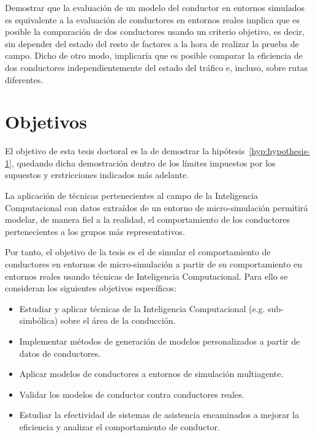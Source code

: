 Demostrar que la evaluación de un modelo del conductor en entornos simulados es equivalente a la evaluación de conductores en entornos reales implica que es posible la comparación de dos conductores usando un criterio objetivo, es decir, sin depender del estado del resto de factores a la hora de realizar la prueba de campo. Dicho de otro modo, implicaría que es posible comparar la eficiencia de dos conductores independientemente del estado del tráfico e, incluso, sobre rutas diferentes.

\section{Objetivos}
\label{ch:intro:objectives}

	El objetivo de esta tesis doctoral es la de demostrar la hipótesis~\ref{hyp:hypothesis-1}, quedando dicha demostración dentro de los límites impuestos por los supuestos y erstricciones indicados más adelante.

\begin{hyp} \label{hyp:hypothesis-1}
	La aplicación de técnicas pertenecientes al campo de la Inteligencia Computacional con datos extraídos de un entorno de micro-simulación permitirá modelar, de manera fiel a la realidad, el comportamiento de los conductores pertenecientes a los grupos más representativos.
\end{hyp}

Por tanto, el objetivo de la tesis es el de simular el comportamiento de conductores en entornos de micro-simulación a partir de su comportamiento en entornos reales usando técnicas de Inteligencia Computacional. Para ello se consideran los siguientes objetivos específicos:

\begin{itemize}
	\item Estudiar y aplicar técnicas de la Inteligencia Computacional (e.g. sub-simbólica) sobre el área de la conducción.
	\item Implementar métodos de generación de modelos personalizados a partir de datos de conductores.
	\item Aplicar modelos de conductores a entornos de simulación multiagente.
	\item Validar los modelos de conductor contra conductores reales.
	\item Estudiar la efectividad de sistemas de asistencia encaminados a mejorar la eficiencia y analizar el comportamiento de conductor.
\end{itemize}

